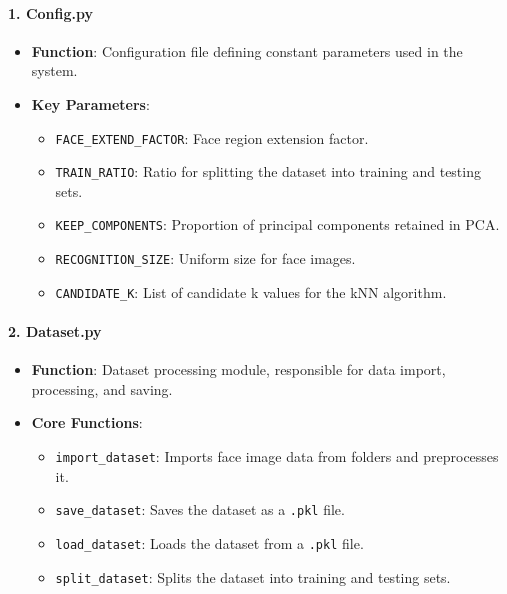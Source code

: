 \documentclass{article}
\begin{document}
\paragraph{1. Config.py}
\begin{itemize}
    \item \textbf{Function}: Configuration file defining constant parameters used in the system.
    \item \textbf{Key Parameters}:
    \begin{itemize}
        \item \texttt{FACE\_EXTEND\_FACTOR}: Face region extension factor.
        \item \texttt{TRAIN\_RATIO}: Ratio for splitting the dataset into training and testing sets.
        \item \texttt{KEEP\_COMPONENTS}: Proportion of principal components retained in PCA.
        \item \texttt{RECOGNITION\_SIZE}: Uniform size for face images.
        \item \texttt{CANDIDATE\_K}: List of candidate k values for the kNN algorithm.
    \end{itemize}
\end{itemize}

\paragraph{2. Dataset.py}
\begin{itemize}
    \item \textbf{Function}: Dataset processing module, responsible for data import, processing, and saving.
    \item \textbf{Core Functions}:
    \begin{itemize}
        \item \texttt{import\_dataset}: Imports face image data from folders and preprocesses it.
        \item \texttt{save\_dataset}: Saves the dataset as a \texttt{.pkl} file.
        \item \texttt{load\_dataset}: Loads the dataset from a \texttt{.pkl} file.
        \item \texttt{split\_dataset}: Splits the dataset into training and testing sets.
    \end{itemize}
\end{itemize}
\end{document}
